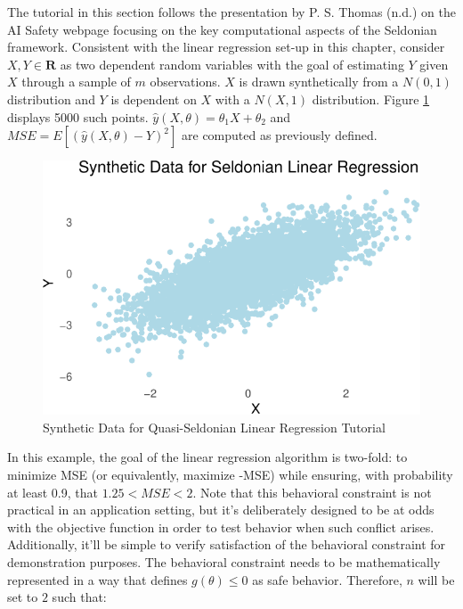 \documentclass[12pt, twoside]{amherstthesis}
\begin{document}
The tutorial in this section follows the presentation by P. S. Thomas (n.d.) on the AI Safety webpage focusing on the key computational aspects of the Seldonian framework. Consistent with the linear regression set-up in this chapter, consider \(X, Y \in \textbf{R}\) as two dependent random variables with the goal of estimating \(Y\) given \(X\) through a sample of \(m\) observations. \(X\) is drawn synthetically from a \(N(0,1)\) distribution and \(Y\) is dependent on \(X\) with a \(N(X,1)\) distribution. Figure \ref{fig:fig2} displays 5000 such points. \(\hat{y}(X, \theta) = \theta_1X+\theta_2\) and \(MSE = E[(\hat{y}(X, \theta)-Y)^2]\) are computed as previously defined.
\begin{figure}

{\centering \includegraphics{Dasha-Asienga_StatThesis_files/figure-latex/fig2-1} 

}

\caption{Synthetic Data for Quasi-Seldonian Linear Regression Tutorial}\label{fig:fig2}
\end{figure}
In this example, the goal of the linear regression algorithm is two-fold: to minimize MSE (or equivalently, maximize -MSE) while ensuring, with probability at least 0.9, that \(1.25 < MSE < 2\). Note that this behavioral constraint is not practical in an application setting, but it's deliberately designed to be at odds with the objective function in order to test behavior when such conflict arises. Additionally, it'll be simple to verify satisfaction of the behavioral constraint for demonstration purposes. The behavioral constraint needs to be mathematically represented in a way that defines \(g(\theta) \leq 0\) as safe behavior. Therefore, \(n\) will be set to \(2\) such that:
\end{document}
